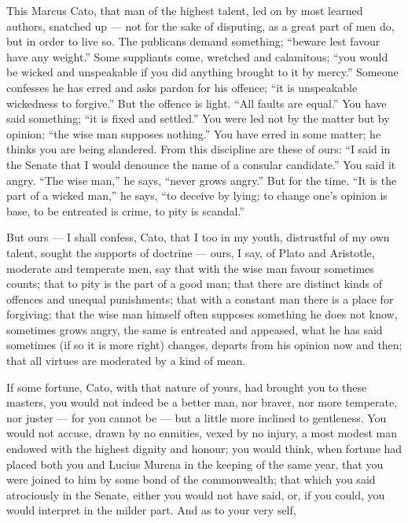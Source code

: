 This Marcus Cato, that man of the highest talent, led on by most learned authors, snatched up --- not for the sake of disputing, as a great part of men do, but in order to live so. The publicans demand something; ``beware lest favour have any weight.'' Some suppliants come, wretched and calamitous; ``you would be wicked and unspeakable if you did anything brought to it by mercy.'' Someone confesses he has erred and asks pardon for his offence; ``it is unspeakable wickedness to forgive.'' But the offence is light. ``All faults are equal.'' You have said something; ``it is fixed and settled.'' You were led not by the matter but by opinion; ``the wise man supposes nothing.'' You have erred in some matter; he thinks you are being slandered. From this discipline are these of ours: ``I said in the Senate that I would denounce the name of a consular candidate.'' You said it angry. ``The wise man,'' he says, ``never grows angry.'' But for the time. ``It is the part of a wicked man,'' he says, ``to deceive by lying; to change one's opinion is base, to be entreated is crime, to pity is scandal.''

 But ours --- I shall confess, Cato, that I too in my youth, distrustful of my own talent, sought the supports of doctrine --- ours, I say, of Plato and Aristotle, moderate and temperate men, say that with the wise man favour sometimes counts; that to pity is the part of a good man; that there are distinct kinds of offences and unequal punishments; that with a constant man there is a place for forgiving; that the wise man himself often supposes something he does not know, sometimes grows angry, the same is entreated and appeased, what he has said sometimes (if so it is more right) changes, departs from his opinion now and then; that all virtues are moderated by a kind of mean.

 If some fortune, Cato, with that nature of yours, had brought you to these masters, you would not indeed be a better man, nor braver, nor more temperate, nor juster --- for you cannot be --- but a little more inclined to gentleness. You would not accuse, drawn by no enmities, vexed by no injury, a most modest man endowed with the highest dignity and honour; you would think, when fortune had placed both you and Lucius Murena in the keeping of the same year, that you were joined to him by some bond of the commonwealth; that which you said atrociously in the Senate, either you would not have said, or, if you could, you would interpret in the milder part. And as to your very self,

